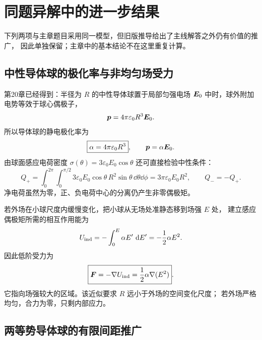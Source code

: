 \section{同题异解中的进一步结果}

下列两项与主章题目采用同一模型，但旧版推导给出了主线解答之外仍有价值的推广，
因此单独保留；主章中的基本结论不在这里重复计算。

\subsection{中性导体球的极化率与非均匀场受力}

第20章已经得到：半径为 $R$ 的中性导体球置于局部匀强电场
$\bm{E}_0$ 中时，球外附加电势等效于球心偶极子，
\[
 \bm{p}=4\pi\varepsilon_0R^3\bm{E}_0.
\]
所以导体球的静电极化率为
\[
 \boxed{\alpha=4\pi\varepsilon_0R^3},
 \qquad \bm{p}=\alpha\bm{E}_0.
\]
由球面感应电荷密度
$\sigma(\theta)=3\varepsilon_0E_0\cos\theta$ 还可直接检验中性条件：
\[
 Q_+=\int_0^{2\pi}\!\int_0^{\pi/2}
 3\varepsilon_0E_0\cos\theta\,R^2\sin\theta
 \,\dd\theta\dd\phi
 =3\pi\varepsilon_0E_0R^2,
 \qquad Q_-=-Q_+.
\]
净电荷虽然为零，正、负电荷中心的分离仍产生非零偶极矩。

若外场在小球尺度内缓慢变化，把小球从无场处准静态移到场强 $E$ 处，
建立感应偶极矩所需的相互作用能为
\[
 U_{\rm ind}=-\int_0^E\alpha E'\,\mathop{}\!\mathrm d E'
 =-\frac12\alpha E^2.
\]
因此低阶受力为
\[
 \boxed{\bm{F}=-\nabla U_{\rm ind}
 =\frac12\alpha\nabla(E^2)}.
\]
它指向场强较大的区域。该近似要求 $R$ 远小于外场的空间变化尺度；
若外场严格均匀，合力为零，只剩内部应力。

\subsection{两等势导体球的有限间距推广}



\endgroup
